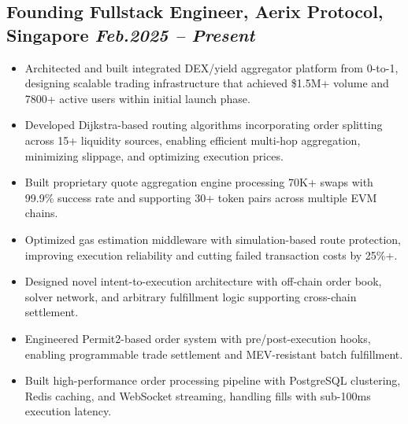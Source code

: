 \documentclass[11pt,a4paper]{article}
\newcommand{\resumeItem}[1]{\item\small{#1}}
\begin{document}
\subsection{Founding Fullstack Engineer, Aerix Protocol, Singapore \hfill \textit{Feb.2025 -- Present}}
\begin{itemize}[leftmargin=*, itemsep=1pt, parsep=0pt]
    \resumeItem{Architected and built integrated DEX/yield aggregator platform from 0-to-1, designing scalable trading infrastructure that achieved \$1.5M+ volume and 7800+ active users within initial launch phase.}
    \resumeItem{Developed Dijkstra-based routing algorithms incorporating order splitting across 15+ liquidity sources, enabling efficient multi-hop aggregation, minimizing slippage, and optimizing execution prices.}
    \resumeItem{Built proprietary quote aggregation engine processing 70K+ swaps with 99.9\% success rate and supporting 30+ token pairs across multiple EVM chains.}
    \resumeItem{Optimized gas estimation middleware with simulation-based route protection, improving execution reliability and cutting failed transaction costs by 25\%+.}
    \resumeItem{Designed novel intent-to-execution architecture with off-chain order book, solver network, and arbitrary fulfillment logic supporting cross-chain settlement.}
    \resumeItem{Engineered Permit2-based order system with pre/post-execution hooks, enabling programmable trade settlement and MEV-resistant batch fulfillment.}
    \resumeItem{Built high-performance order processing pipeline with PostgreSQL clustering, Redis caching, and WebSocket streaming, handling fills with sub-100ms execution latency.}

\end{itemize}
\end{document}
